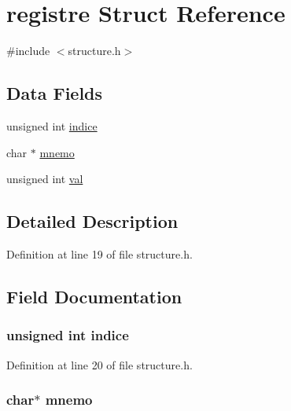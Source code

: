 \hypertarget{structregistre}{\section{registre \-Struct \-Reference}
\label{structregistre}
}


{\ttfamily \#include $<$structure.\-h$>$}

\subsection*{\-Data \-Fields}
\begin{DoxyCompactItemize}
\item 
unsigned int \hyperlink{structregistre_a3d17db3506a2322e40f591f2d1414c05}{indice}
\item 
char $\ast$ \hyperlink{structregistre_a124151291ba6f58b7dfa62b9bcc6bd52}{mnemo}
\item 
unsigned int \hyperlink{structregistre_a9163138d612480a614fa98c44e4318c4}{val}
\end{DoxyCompactItemize}


\subsection{\-Detailed \-Description}


\-Definition at line 19 of file structure.\-h.



\subsection{\-Field \-Documentation}
\hypertarget{structregistre_a3d17db3506a2322e40f591f2d1414c05}{
\subsubsection[{indice}]{\setlength{\rightskip}{0pt plus 5cm}unsigned int {\bf indice}}}\label{structregistre_a3d17db3506a2322e40f591f2d1414c05}


\-Definition at line 20 of file structure.\-h.

\hypertarget{structregistre_a124151291ba6f58b7dfa62b9bcc6bd52}{
\subsubsection[{mnemo}]{\setlength{\rightskip}{0pt plus 5cm}char$\ast$ {\bf mnemo}}}\label{structregistre_a124151291ba6f58b7dfa62b9bcc6bd52}


